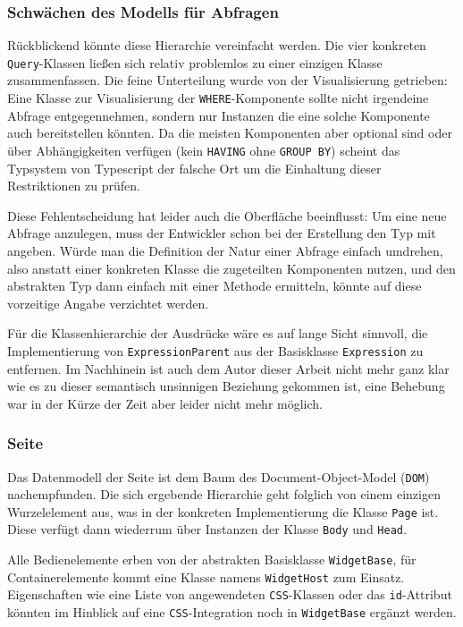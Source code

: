 \subsubsection{Schwächen des Modells für Abfragen}

Rückblickend könnte diese Hierarchie vereinfacht werden. Die vier konkreten \texttt{Query}-Klassen ließen sich relativ problemlos zu einer einzigen Klasse zusammenfassen. Die feine Unterteilung wurde von der Visualisierung getrieben: Eine Klasse zur Visualisierung der \texttt{WHERE}-Komponente sollte nicht irgendeine Abfrage entgegennehmen, sondern nur Instanzen die eine solche Komponente auch bereitstellen könnten. Da die meisten Komponenten aber optional sind oder über Abhängigkeiten verfügen (kein \texttt{HAVING} ohne \texttt{GROUP BY}) scheint das Typsystem von Typescript der falsche Ort um die Einhaltung dieser Restriktionen zu prüfen.

Diese Fehlentscheidung hat leider auch die Oberfläche beeinflusst: Um eine neue Abfrage anzulegen, muss der Entwickler schon bei der Erstellung den Typ mit angeben. Würde man die Definition der Natur einer Abfrage einfach umdrehen, also anstatt einer konkreten Klasse die zugeteilten Komponenten nutzen, und den abstrakten Typ dann einfach mit einer Methode ermitteln, könnte auf diese vorzeitige Angabe verzichtet werden.

Für die Klassenhierarchie der Ausdrücke wäre es auf lange Sicht sinnvoll, die Implementierung von \texttt{ExpressionParent} aus der Basisklasse \texttt{Expression} zu entfernen. Im Nachhinein ist auch dem Autor dieser Arbeit nicht mehr ganz klar wie es zu dieser semantisch unsinnigen Beziehung gekommen ist, eine Behebung war in der Kürze der Zeit aber leider nicht mehr möglich.

\subsubsection{Seite}

Das Datenmodell der Seite ist dem Baum des Document-Object-Model (\texttt{DOM}) nachempfunden. Die sich ergebende Hierarchie geht folglich von einem einzigen Wurzelelement aus, was in der konkreten Implementierung die Klasse \texttt{Page} ist. Diese verfügt dann wiederrum über Instanzen der Klasse \texttt{Body} und \texttt{Head}.

Alle Bedienelemente erben von der abstrakten Basisklasse \texttt{WidgetBase}, für Containerelemente kommt eine Klasse namens \texttt{WidgetHost} zum Einsatz. Eigenschaften wie eine Liste von angewendeten \texttt{CSS}-Klassen oder das \texttt{id}-Attribut könnten im Hinblick auf eine \texttt{CSS}-Integration noch in \texttt{WidgetBase} ergänzt werden.

